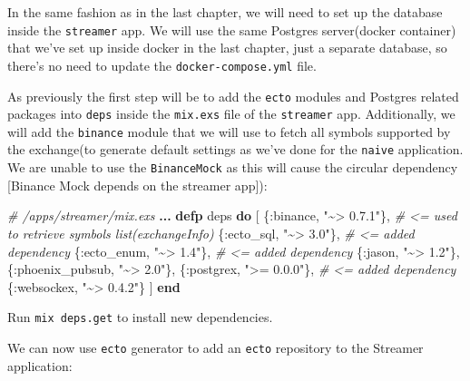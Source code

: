 \documentclass[
]{book}
\newenvironment{Shaded}{\begin{snugshade}}{\end{snugshade}}
\newcommand{\CommentTok}[1]{\textcolor[rgb]{0.56,0.35,0.01}{\textit{#1}}}
\newcommand{\KeywordTok}[1]{\textcolor[rgb]{0.13,0.29,0.53}{\textbf{#1}}}
\newcommand{\NormalTok}[1]{#1}
\newcommand{\OperatorTok}[1]{\textcolor[rgb]{0.81,0.36,0.00}{\textbf{#1}}}
\newcommand{\StringTok}[1]{\textcolor[rgb]{0.31,0.60,0.02}{#1}}
\newcommand{\VariableTok}[1]{\textcolor[rgb]{0.00,0.00,0.00}{#1}}
\begin{document}
In the same fashion as in the last chapter, we will need to set up the database inside the \texttt{streamer} app. We will use the same Postgres server(docker container) that we've set up inside docker in the last chapter, just a separate database, so there's no need to update the \texttt{docker-compose.yml} file.

As previously the first step will be to add the \texttt{ecto} modules and Postgres related packages into \texttt{deps} inside the \texttt{mix.exs} file of the \texttt{streamer} app. Additionally, we will add the \texttt{binance} module that we will use to fetch all symbols supported by the exchange(to generate default settings as we've done for the \texttt{naive} application. We are unable to use the \texttt{BinanceMock} as this will cause the circular dependency {[}Binance Mock depends on the streamer app{]}):

\begin{Shaded}
\begin{Highlighting}[]
  \CommentTok{\# /apps/streamer/mix.exs}
  \OperatorTok{...}
  \KeywordTok{defp}\NormalTok{ deps }\KeywordTok{do}
\NormalTok{    [}
\NormalTok{      \{}\VariableTok{:binance}\NormalTok{, }\StringTok{"\textasciitilde{}\textgreater{} 0.7.1"}\NormalTok{\}, }\CommentTok{\# \textless{}= used to retrieve symbols list(exchangeInfo)}
\NormalTok{      \{}\VariableTok{:ecto\_sql}\NormalTok{, }\StringTok{"\textasciitilde{}\textgreater{} 3.0"}\NormalTok{\},  }\CommentTok{\# \textless{}= added dependency}
\NormalTok{      \{}\VariableTok{:ecto\_enum}\NormalTok{, }\StringTok{"\textasciitilde{}\textgreater{} 1.4"}\NormalTok{\}, }\CommentTok{\# \textless{}= added dependency}
\NormalTok{      \{}\VariableTok{:jason}\NormalTok{, }\StringTok{"\textasciitilde{}\textgreater{} 1.2"}\NormalTok{\},}
\NormalTok{      \{}\VariableTok{:phoenix\_pubsub}\NormalTok{, }\StringTok{"\textasciitilde{}\textgreater{} 2.0"}\NormalTok{\},}
\NormalTok{      \{}\VariableTok{:postgrex}\NormalTok{, }\StringTok{"\textgreater{}= 0.0.0"}\NormalTok{\}, }\CommentTok{\# \textless{}= added dependency}
\NormalTok{      \{}\VariableTok{:websockex}\NormalTok{, }\StringTok{"\textasciitilde{}\textgreater{} 0.4.2"}\NormalTok{\}}
\NormalTok{    ]}
  \KeywordTok{end}
\end{Highlighting}
\end{Shaded}

Run \texttt{mix\ deps.get} to install new dependencies.

We can now use \texttt{ecto} generator to add an \texttt{ecto} repository to the Streamer application:
\end{document}
